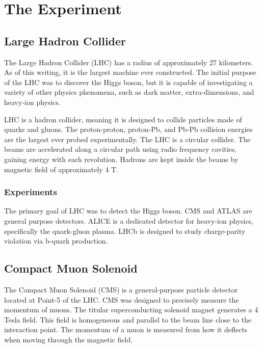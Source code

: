 
\chapter{The Experiment}

\section{Large Hadron Collider}

The Large Hadron Collider (LHC) has a radius of approximately 27 kilometers. As of this writing, it is the largest machine ever constructed. The initial purpose of the LHC was to discover the Higgs boson, but it is capable of investigating a variety of other physics phenomena, such as dark matter, extra-dimensions, and heavy-ion physics. 

LHC is a hadron collider, meaning it is designed to collide particles made of quarks and gluons. The proton-proton, proton-Pb, and Pb-Pb collision energies are the largest ever probed experimentally. The LHC is a circular collider. The beams are accelerated along a circular path using radio frequency cavities, gaining energy with each revolution. Hadrons are kept inside the beams by magnetic field of approximately 4 T. 

\subsection{Experiments}

The primary goal of LHC was to detect the Higgs boson. CMS and ATLAS are general purpose detectors. ALICE is a dedicated detector for heavy-ion physics, specifically the quark-gluon plasma. LHCb is designed to study charge-parity violation via b-quark production.

\section{Compact Muon Solenoid}

The Compact Muon Solenoid (CMS) is a general-purpose particle detector located at Point-5 of the LHC. CMS was designed to precisely measure the momentum of muons. The titular superconducting solenoid magnet generates a 4 Tesla field. This field is homogeneous and parallel to the beam line close to the interaction point. The momentum of a muon is measured from how it deflects when moving through the magnetic field. 

